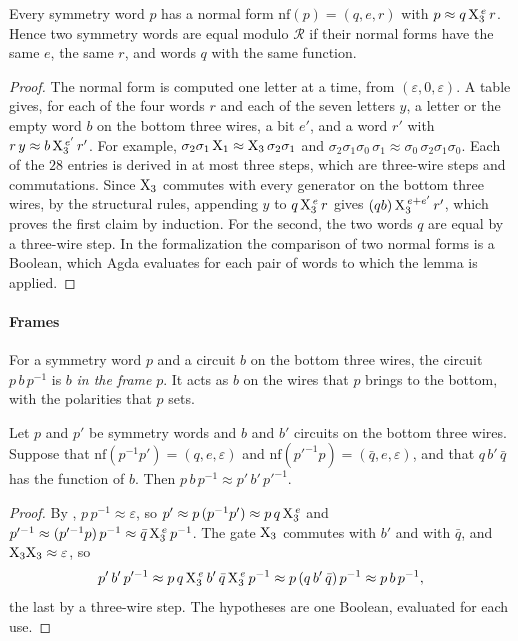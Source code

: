 \documentclass[acmsmall,screen,nonacm]{acmart}
\begin{document}
\begin{lemma}\label{lem:x-hstep}
Every symmetry word $p$ has a normal form $\mathrm{nf}(p)=(q,e,r)$ with $p\approx q\,\mathrm{X}_3^{\,e}\,r$. Hence two symmetry words are equal modulo $\mathcal{R}$ if their normal forms have the same $e$, the same $r$, and words $q$ with the same function.
\end{lemma}

\begin{proof}
The normal form is computed one letter at a time, from $(\varepsilon,0,\varepsilon)$. A table gives, for each of the four words $r$ and each of the seven letters $y$, a letter or the empty word $b$ on the bottom three wires, a bit $e'$, and a word $r'$ with $r\,y\approx b\,\mathrm{X}_3^{\,e'}\,r'$. For example, $\sigma_2\sigma_1\,\mathrm{X}_1\approx\mathrm{X}_3\,\sigma_2\sigma_1$ and $\sigma_2\sigma_1\sigma_0\,\sigma_1\approx\sigma_0\,\sigma_2\sigma_1\sigma_0$. Each of the $28$ entries is derived in at most three steps, which are three-wire steps and commutations. Since $\mathrm{X}_3$ commutes with every generator on the bottom three wires, by the structural rules, appending $y$ to $q\,\mathrm{X}_3^{\,e}\,r$ gives $(qb)\,\mathrm{X}_3^{\,e+e'}\,r'$, which proves the first claim by induction. For the second, the two words $q$ are equal by a three-wire step. In the formalization the comparison of two normal forms is a Boolean, which Agda evaluates for each pair of words to which the lemma is applied.
\end{proof}

\paragraph{Frames} For a symmetry word $p$ and a circuit $b$ on the bottom three wires, the circuit $p\,b\,p^{-1}$ is $b$ \emph{in the frame} $p$. It acts as $b$ on the wires that $p$ brings to the bottom, with the polarities that $p$ sets.

\begin{lemma}\label{lem:x-frame}
Let $p$ and $p'$ be symmetry words and $b$ and $b'$ circuits on the bottom three wires. Suppose that $\mathrm{nf}(p^{-1}p')=(q,e,\varepsilon)$ and $\mathrm{nf}(p'^{-1}p)=(\bar q,e,\varepsilon)$, and that $q\,b'\,\bar q$ has the function of $b$. Then $p\,b\,p^{-1}\approx p'\,b'\,p'^{-1}$.
\end{lemma}

\begin{proof}
By , $p\,p^{-1}\approx\varepsilon$, so $p'\approx p\,(p^{-1}p')\approx p\,q\,\mathrm{X}_3^{\,e}$ and $p'^{-1}\approx(p'^{-1}p)\,p^{-1}\approx\bar q\,\mathrm{X}_3^{\,e}\,p^{-1}$. The gate $\mathrm{X}_3$ commutes with $b'$ and with $\bar q$, and $\mathrm{X}_3\mathrm{X}_3\approx\varepsilon$, so
\[
p'\,b'\,p'^{-1}\approx p\,q\,\mathrm{X}_3^{\,e}\,b'\,\bar q\,\mathrm{X}_3^{\,e}\,p^{-1}\approx p\,(q\,b'\,\bar q)\,p^{-1}\approx p\,b\,p^{-1},
\]
the last by a three-wire step. The hypotheses are one Boolean, evaluated for each use.
\end{proof}
\end{document}

